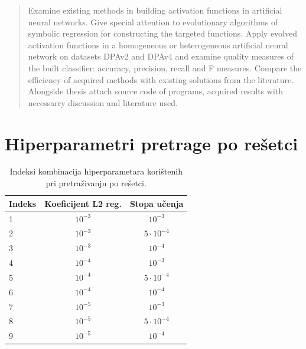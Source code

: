 \documentclass[times, utf8, numeric, diplomski]{fer}
\begin{document}
\begin{abstract}
Examine existing methods in building activation functions in artificial neural networks. Give special attention to evolutionary algorithms of symbolic regression for constructing the targeted functions. Apply evolved activation functions in a homogeneous or heterogeneous artificial neural network on datasets DPAv2 and DPAv4 and examine quality measures of the built classifier: accuracy, precision, recall and F measures. Compare the efficiency of acquired methods with existing solutions from the literature. Alongside thesis attach source code of programs, acquired results with necessarry discussion and literature used.

\end{abstract}

\appendix
\chapter{Hiperparametri pretrage po rešetci}
\label{app:grid_hp}

\begin{table}
\centering
\begin{tabular}{lcc}
Indeks & Koeficijent L2 reg. & Stopa učenja \\
\hline
1 & $10^{-3}$ & $10^{-3}$  \\
2 & $10^{-3}$ & $5 \cdot 10^{-4}$ \\
3 & $10^{-3}$ & $10^{-4}$ \\
4 & $10^{-4}$ & $10^{-3}$ \\
5 & $10^{-4}$ & $5 \cdot 10^{-4}$ \\
6 & $10^{-4}$ & $10^{-4}$ \\
7 & $10^{-5}$ & $10^{-3}$ \\
8 & $10^{-5}$ & $5 \cdot 10^{-4}$ \\
9 & $10^{-5}$ & $10^{-4}$
\end{tabular}
\caption{Indeksi kombinacija hiperparametara korištenih pri pretraživanju po rešetci.}
\label{tab:hp_comb}
\end{table}
\end{document}
